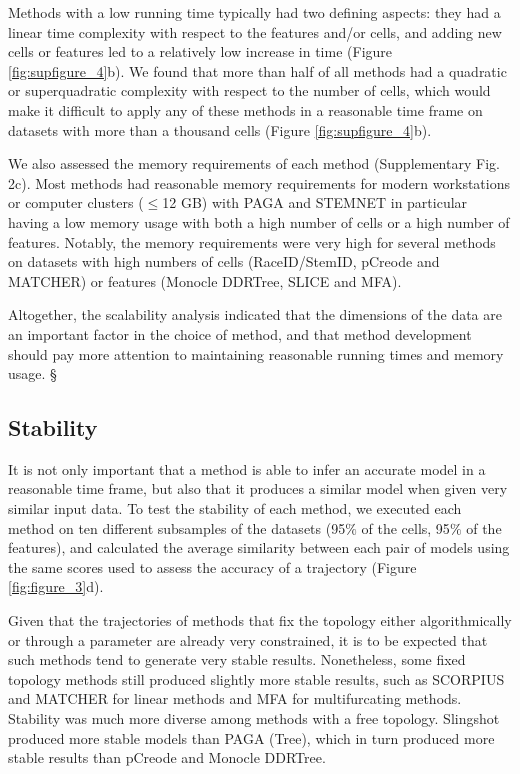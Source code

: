 Methods with a low running time typically had two defining aspects: they had a linear time complexity with respect to the features and/or cells, and adding new cells or features led to a relatively low increase in time (Figure \ref{fig:supfigure_4}b). We found that more than half of all methods had a quadratic or superquadratic complexity with respect to the number of cells, which would make it difficult to apply any of these methods in a reasonable time frame on datasets with more than a thousand cells (Figure \ref{fig:supfigure_4}b).

We also assessed the memory requirements of each method (Supplementary Fig. 2c). Most methods had reasonable memory requirements for modern workstations or computer clusters ($\leq$12 GB) with PAGA and STEMNET in particular having a low memory usage with both a high number of cells or a high number of features. Notably, the memory requirements were very high for several methods on datasets with high numbers of cells (RaceID/StemID, pCreode and MATCHER) or features (Monocle DDRTree, SLICE and MFA).

Altogether, the scalability analysis indicated that the dimensions of the data are an important factor in the choice of method, and that method development should pay more attention to maintaining reasonable running times and memory usage.
§
\subsection{Stability}

It is not only important that a method is able to infer an accurate model in a reasonable time frame, but also that it produces a similar model when given very similar input data. To test the stability of each method, we executed each method on ten different subsamples of the datasets (95$\%$ of the cells, 95$\%$ of the features), and calculated the average similarity between each pair of models using the same scores used to assess the accuracy of a trajectory (Figure \ref{fig:figure_3}d).

Given that the trajectories of methods that fix the topology either algorithmically or through a parameter are already very constrained, it is to be expected that such methods tend to generate very stable results. Nonetheless, some fixed topology methods still produced slightly more stable results, such as SCORPIUS and MATCHER for linear methods and MFA for multifurcating methods. Stability was much more diverse among methods with a free topology. Slingshot produced more stable models than PAGA (Tree), which in turn produced more stable results than pCreode and Monocle DDRTree.

